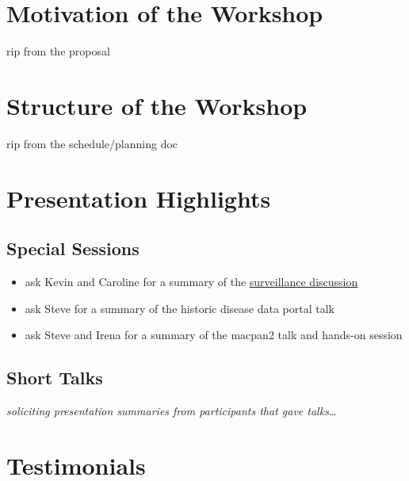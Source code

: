 \section{Motivation of the Workshop}

rip from the proposal

\section{Structure of the Workshop}

rip from the schedule/planning doc

\section{Presentation Highlights}

\subsection{Special Sessions}

\begin{itemize}
    \item ask Kevin and Caroline for a summary of the \href{https://docs.google.com/document/d/1WUFj6_ApVh40l7UZxc2OuJtabaRY_dU188ZkXpyyrL8}{surveillance discussion}
    \item ask Steve for a summary of the historic disease data portal talk
    \item ask Steve and Irena for a summary of the macpan2 talk and hands-on session
\end{itemize}

\subsection{Short Talks}

\emph{soliciting presentation summaries from participants that gave talks\dots}












\section{Testimonials}

